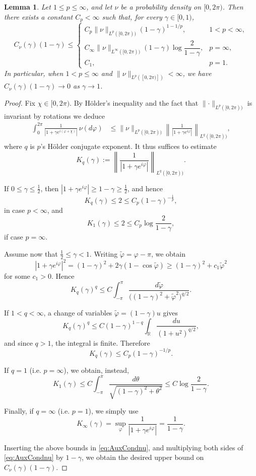 \documentclass[10pt]{article}
\newtheorem{lemma}[theorem]{Lemma}
\theoremstyle{definition}
\theoremstyle{definition}
\numberwithin{equation}{section}
\newcommand{\Wvarphi}{\widetilde{\varphi}}
\begin{document}
\begin{lemma}\label{lem:nu-lp-unified}
Let $1 \le p \le \infty$, and let $\nu$ be a probability density on $[0,2\pi)$. Then there exists a constant $C_p<\infty$ such that, for every $\gamma \in [0,1)$, 
\[
C_\nu(\gamma) (1-\gamma) \leq
\begin{cases}
C_p \|\nu\|_{L^p([0,2\pi))} (1-\gamma)^{1-1/p}, & 1<p<\infty,\\[1ex]
C_\infty \|\nu\|_{L^\infty([0,2\pi))} (1-\gamma) \log \dfrac{2}{1-\gamma}, & p=\infty,\\[2ex]
C_1, & p=1.
\end{cases}
\]
In particular, when $1<p \leq \infty$ and $\lVert \nu \rVert_{L^p([0,2\pi)])}<\infty$, we have $C_\nu(\gamma)(1-\gamma) \to 0$ as $\gamma \to 1$.
\end{lemma}

\begin{proof}
Fix $\chi \in[0,2\pi)$. 
By Hölder's inequality and the fact that $\lVert \cdot \rVert_{L^p([0,2\pi))}$ is invariant by rotations we deduce
\begin{equation}
\label{eq:AuxCondnu}
\begin{aligned}
\int_0^{2\pi} \frac{1}{|1+\gamma e^{i(\varphi+\chi)}|}\,\nu(d\varphi)
&\leq \|\nu\|_{L^p([0,2\pi))} 
\left\|\frac{1}{|1+\gamma e^{i\varphi}|}\right\|_{L^q([0,2\pi))},
\end{aligned}
\end{equation}
where $q$ is $p$'s Hölder conjugate exponent. It thus suffices to estimate
\[
K_q(\gamma):=\left\|\frac{1}{|1+\gamma e^{i\varphi}|}\right\|_{L^q([0,2\pi))}.
\]

If $0\le \gamma \le \frac12$, then $|1+\gamma e^{i\varphi}|\ge 1-\gamma\ge \frac12$, and hence
\[
K_q(\gamma)\leq 2 \leq C_p (1-\gamma)^{-\frac{1}{p}},
\]
in case $p<\infty$, and
\[
K_1(\gamma) \leq 2 \leq C_p \log\frac{2}{1-\gamma},
\]
if case $p=\infty$.

Assume now that $\frac12\le \gamma<1$. Writing $\Wvarphi=\varphi-\pi$, we obtain
\[
|1+\gamma e^{i\varphi}|^2 = (1-\gamma)^2 + 2\gamma(1-\cos\Wvarphi)
\ge (1-\gamma)^2 + c_1 \Wvarphi^2
\]
for some $c_1>0$. Hence
\[
K_q(\gamma)^q \le C \int_{-\pi}^{\pi} \frac{d\Wvarphi}{\big((1-\gamma)^2+\Wvarphi^2\big)^{q/2}}.
\]

If $1<q<\infty$, a change of variables $\Wvarphi=(1-\gamma)u$ gives
\[
K_q(\gamma)^q \le C (1-\gamma)^{1-q} \int_{\mathbb R}\frac{du}{(1+u^2)^{q/2}},
\]
and since $q>1$, the integral is finite. Therefore
\[
K_q(\gamma)\le C_p (1-\gamma)^{-1/p}.
\]

If $q=1$ (i.e. $p=\infty$), we obtain, instead,
\[
K_1(\gamma) \le C \int_{-\pi}^{\pi} \frac{d\theta}{\sqrt{(1-\gamma)^2+\theta^2}}
\le C \log\frac{2}{1-\gamma}.
\]

Finally, if $q=\infty$ (i.e. $p=1$), we simply use
\[
K_\infty(\gamma)=\sup_\varphi \frac{1}{|1+\gamma e^{i\varphi}|}
= \frac{1}{1-\gamma}.
\]

Inserting the above bounds in \eqref{eq:AuxCondnu}, and multiplying both sides of \eqref{eq:AuxCondnu} by $1-\gamma$, we obtain the desired upper bound on $C_\nu(\gamma)(1-\gamma)$. 
\end{proof}
\end{document}
